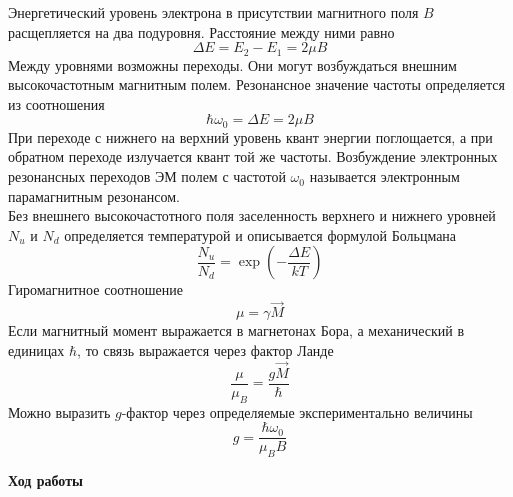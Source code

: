 \documentclass[12pt]{article}
\begin{document}
Энергетический уровень электрона в присутствии магнитного поля $B$ расщепляется
на два подуровня. Расстояние между ними равно
\begin{equation}
    \label{eq:(1)}
    \Delta E = E_2 - E_1 = 2 \mu B
\end{equation}
Между уровнями возможны переходы. Они могут возбуждаться внешним высокочастотным
магнитным полем. Резонансное значение частоты определяется из соотношения
\begin{equation}
    \label{eq:(2)}
    \hbar \omega_0 = \Delta E = 2 \mu B
\end{equation}
При переходе с нижнего на верхний уровень квант энергии поглощается, а при
обратном переходе излучается квант той же частоты. Возбуждение электронных
резонансных переходов ЭМ полем с частотой $\omega_0$ называется электронным
парамагнитным резонансом.
\\
Без внешнего высокочастотного поля заселенность верхнего и нижнего уровней $N_u$
и $N_d$ определяется температурой и описывается формулой Больцмана
\begin{equation}
    \label{eq:(3)}
    \frac{N_u}{N_d} = \exp \left( - \frac{\Delta E}{k T} \right)
\end{equation}
Гиромагнитное соотношение
\begin{equation}
    \label{eq:(4)}
    \mu = \gamma \vec{M}
\end{equation}
Если магнитный момент выражается в магнетонах Бора, а механический в единицах
$\hbar$, то связь выражается через фактор Ланде
\begin{equation}
    \label{eq:(5)}
    \frac{\mu}{\mu_B} = \frac{g \vec{M}}{\hbar}
\end{equation}
Можно выразить $g$-фактор через определяемые экспериментально величины
\begin{equation}
    \label{eq:(6)}
    g = \frac{\hbar \omega_0}{\mu_B B}
\end{equation}
\newpage
\begin{center}
    \textbf{Ход работы}
\end{center}
\end{document}
